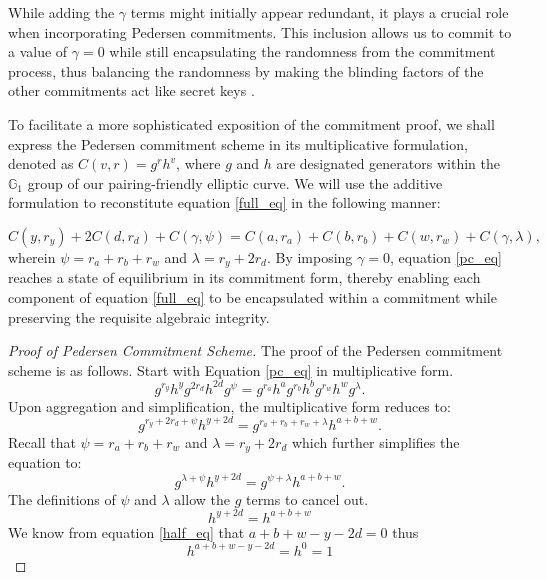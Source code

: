 \documentclass[version=preprint]{iacrcc}
\begin{document}
While adding the \( \gamma \) terms might initially appear redundant, it plays a crucial role when incorporating Pedersen commitments. This inclusion allows us to commit to a value of \( \gamma = 0 \) while still encapsulating the randomness from the commitment process, thus balancing the randomness by making the blinding factors of the other commitments act like secret keys \cite{mw16}.

To facilitate a more sophisticated exposition of the commitment proof, we shall express the Pedersen commitment scheme in its multiplicative formulation, denoted as \( C(v, r) = g^{r} h^{v} \), where \( g \) and \( h \) are designated generators within the \( \mathbb{G}_{1} \) group of our pairing-friendly elliptic curve. We will use the additive formulation to reconstitute equation \ref{full_eq} in the following manner:

\begin{equation}
\label{pc_eq}
C(y, r_{y}) + 2 C(d, r_{d}) + C(\gamma, \psi) = C(a, r_{a}) + C(b, r_{b}) + C(w, r_{w}) + C(\gamma, \lambda),
\end{equation}
wherein \( \psi = r_{a} + r_{b} + r_{w} \) and \( \lambda = r_{y} + 2r_{d} \). By imposing \( \gamma = 0 \), equation \ref{pc_eq} reaches a state of equilibrium in its commitment form, thereby enabling each component of equation \ref{full_eq} to be encapsulated within a commitment while preserving the requisite algebraic integrity.

\begin{proof}[Proof of Pedersen Commitment Scheme]
\label{commitment_proof}
The proof of the Pedersen commitment scheme is as follows. Start with Equation \ref{pc_eq} in multiplicative form.
\begin{equation}
g^{r_{y}} h^{y} g^{2 r_{d}} h^{2 d} g^{\psi} = g^{r_{a}} h^{a} g^{r_{b}} h^{b} g^{r_{w}} h^{w} g^{\lambda}.
\end{equation}
Upon aggregation and simplification, the multiplicative form reduces to:
\begin{equation}
\label{full_form}
g^{r_{y} + 2 r_{d} + \psi} h^{y + 2 d}  = g^{r_{a} + r_{b} + r_{w} + \lambda}  h^{a + b + w}.
\end{equation}
Recall that \( \psi = r_{a} + r_{b} + r_{w} \) and \( \lambda = r_{y} + 2r_{d} \) which further simplifies the equation to:
\begin{equation}
g^{\lambda + \psi} h^{y + 2 d}  = g^{\psi + \lambda}  h^{a + b + w}.
\end{equation}
The definitions of \( \psi \) and \( \lambda \) allow the \( g \) terms to cancel out.
\begin{equation}
h^{y + 2 d} = h^{a + b + w}
\end{equation}
We know from equation \ref{half_eq} that $a + b + w - y - 2d = 0$ thus
\begin{equation}
h^{a + b + w - y - 2 d} = h^{0} = 1
\end{equation}

\end{proof}
\end{document}
